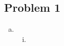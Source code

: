 \documentclass[a4paper]{article}
\begin{document}
    \subsection*{Problem 1}
    \begin{enumerate}[a)]
        \item \begin{enumerate}[i.]
            \item 
        \end{enumerate}
    \end{enumerate} 
\end{document}
